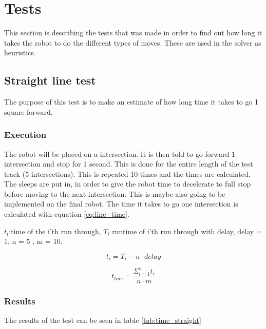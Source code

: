 \section{Tests}
This section is describing the tests that was made in order to find out how long it takes the robot to do the different types of moves.
These are used in the solver as heuristics.

\subsection{Straight line test} \label{sec:line_time}
The purpose of this test is to make an estimate of how long time it takes to go 1 square forward. 

\subsubsection{Execution}
The robot will be placed on a intersection. It is then told to go forward 1 intersection and stop for 1 second. This is done for the entire length of the test track (5 intersections). This is repeated 10 times and the times are calculated. The sleeps are put in, in order to give the robot time to decelerate to full stop before moving to the next intersection. This is maybe also going to be implemented on the final robot. The time it takes to go one intersection is calculated with equation \ref{eq:line_time}. 

$t_i$:time of the i'th run through, $T_i$ runtime of i'th run through with delay, delay = 1, n = 5 , m = 10.

\begin{equation} \label{eq:t_no_delay}
t_i = T_i - n\cdot delay
\end{equation}

\begin{equation}\label{eq:line_time}
 t_{line} =\frac{ \Sigma_{i=1}^n t_i}{n\cdot m}
\end{equation}

\subsubsection{Results}
The results of the test can be seen in table \ref{tab:time_straight}


